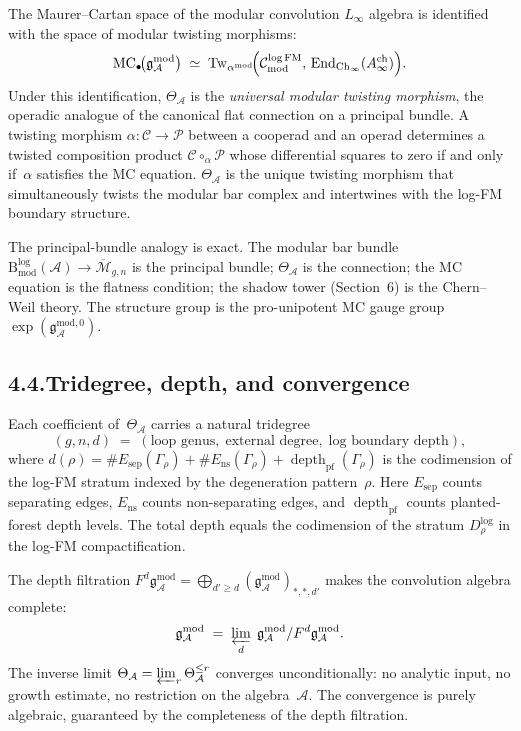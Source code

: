 \documentclass[11pt]{report}
\theoremstyle{definition}
\theoremstyle{remark}
\providecommand{\cA}{\mathcal{A}}
\providecommand{\cC}{\mathcal{C}}
\providecommand{\cM}{\mathcal{M}}
\providecommand{\cP}{\mathcal{P}}
\providecommand{\gAmod}{\mathfrak{g}^{\mathrm{mod}}_\cA}
\numberwithin{equation}{section}
\begin{document}
The Maurer--Cartan space of the modular convolution $L_\infty$
algebra is identified with the space of modular twisting morphisms:
\[
\operatorname{MC}_\bullet\!\bigl(\gAmod\bigr)
\;\simeq\;
\operatorname{Tw}_{\alpha^{\mathrm{mod}}}\!\Bigl(
\cC^{\log\mathrm{FM}}_{\mathrm{mod}},\,
\operatorname{End}_{\mathrm{Ch}_\infty}(A^{\mathrm{ch}}_\infty)
\Bigr).
\]
Under this identification, $\Theta_\cA$ is the \emph{universal
modular twisting morphism}, the operadic analogue of the canonical
flat connection on a principal bundle. A twisting
morphism $\alpha\colon\cC\to\cP$ between a cooperad and an operad
determines a twisted composition product $\cC\circ_\alpha\cP$ whose
differential squares to zero if and only if~$\alpha$ satisfies the
MC equation. $\Theta_\cA$ is the unique twisting morphism that
simultaneously twists the modular bar complex and intertwines with
the log-FM boundary structure.

The principal-bundle analogy is exact. The modular bar
bundle $\mathrm{B}^{\log}_{\mathrm{mod}}(\cA)\to
\overline{\cM}_{g,n}$ is the principal bundle; $\Theta_\cA$ is the
connection; the MC equation is the flatness condition; the shadow
tower (Section~6) is the Chern--Weil theory. The structure group is
the pro-unipotent MC gauge group
$\exp(\mathfrak g^{\mathrm{mod},0}_\cA)$.

\subsection*{4.4.\enspace Tridegree, depth, and convergence}

Each coefficient of~$\Theta_\cA$ carries a natural tridegree
\[
(g,n,d)
\;=\;
(\text{loop genus},\;\text{external degree},\;\text{log boundary depth}),
\]
where $d(\rho)=\#E_{\mathrm{sep}}(\Gamma_\rho)+
\#E_{\mathrm{ns}}(\Gamma_\rho)+\operatorname{depth}_{\mathrm{pf}}
(\Gamma_\rho)$ is the codimension of the log-FM stratum indexed by
the degeneration pattern~$\rho$. Here $E_{\mathrm{sep}}$ counts
separating edges, $E_{\mathrm{ns}}$ counts non-separating edges, and
$\operatorname{depth}_{\mathrm{pf}}$ counts planted-forest depth
levels. The total depth equals the codimension of the stratum
$D^{\log}_\rho$ in the log-FM compactification.

The depth filtration
$F^d\gAmod=\bigoplus_{d'\ge d}(\gAmod)_{*,*,d'}$ makes
the convolution algebra complete:
\[
\gAmod\;=\;\varprojlim_{d}\;\gAmod/F^d\gAmod.
\]
The inverse limit
$\Theta_\cA=\varprojlim_r\Theta_\cA^{\le r}$ converges
unconditionally: no analytic input, no growth estimate, no
restriction on the algebra~$\cA$. The convergence is purely
algebraic, guaranteed by the completeness of the depth filtration.
\end{document}
